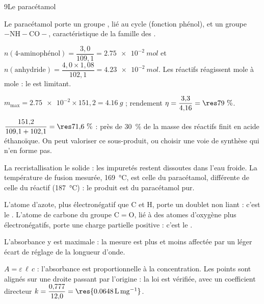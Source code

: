 

\begin{corrigeBac}{9}{Le paracétamol}
\begin{questions}
\item Le paracétamol porte un groupe , lié au cycle (fonction phénol), et un groupe 
$-\mathrm{NH}-\mathrm{CO}-$, caractéristique de la famille des . 
\item $n(\text{4-aminophénol})=\dfrac{3{,}0}{109{,}1}=\qty{2,75e-2}{mol}$ et $n(\text{anhydride})=\dfrac{4{,}0\times1{,}08}{102{,}1}=\qty{4,23e-2}{mol}$. Les réactifs
réagissent mole à mole : le  est limitant. 
\item $m_\mathrm{max}=\num{2.75e-2}\times151{,}2=\qty{4,16}{g}$ ; rendement $\eta=\dfrac{3{,}3}{4{,}16}=\res{79~\%}$. 
\item $\dfrac{151{,}2}{109{,}1+102{,}1}=\res{71{,}6~\%}$ : près de 30~\% de la masse des réactifs finit en acide éthanoïque. On peut valoriser ce
sous-produit, ou choisir une voie de synthèse qui n'en forme pas. \pts{1 pt}
\item La recristallisation  le solide : les impuretés restent dissoutes dans l'eau froide. La température de
fusion mesurée, \qty{169}{\degreeCelsius}, est celle du paracétamol, différente de celle du réactif (\qty{187}{\degreeCelsius}) : le produit est
du paracétamol pur. 
\item L'atome d'azote, plus électronégatif que C et H, porte un doublet non liant : c'est le . L'atome de
carbone du groupe C$=$O, lié à des atomes d'oxygène plus électronégatifs, porte une charge partielle positive : c'est le
. 
\end{questions}
\begin{questions}[resume]
\item L'absorbance y est maximale : la mesure est plus  et moins affectée par un léger écart de réglage de la
longueur d'onde. 
\item $A=\varepsilon\,\ell\,c$ : l'absorbance est proportionnelle à la concentration. Les points sont alignés sur une droite passant par
l'origine : la loi est vérifiée, avec un coefficient directeur $k=\dfrac{0{,}777}{12{,}0}=\res{\qty{0,0648}{L.mg^{-1}}}$. 

\end{questions}
\end{corrigeBac}
